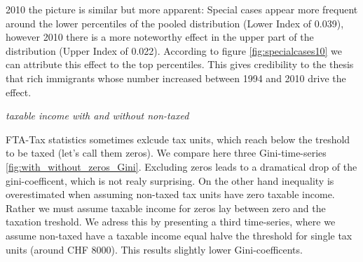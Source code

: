 \documentclass[twoside]{article}\usepackage[]{graphicx}\usepackage[]{color}
\begin{document}
\begin{multicols}{2}
\begin{table}[H]
\end{table}


2010 the picture is similar but more apparent: Special cases appear more frequent around the lower percentiles of the pooled distribution (Lower Index of 0.039), however 2010 there is a more noteworthy effect in the upper part of the distribution (Upper Index of 0.022). According to figure \ref{fig:specialcases10} we can attribute this effect to the top percentiles. This gives credibility to the thesis that rich immigrants whose number increased between 1994 and 2010 drive the effect.





\emph{taxable income with and without non-taxed}

FTA-Tax statistics sometimes exlcude tax units, which reach below the treshold to be taxed (let's call them zeros). We compare here three Gini-time-series \ref{fig:with_without_zeros_Gini}. Excluding zeros leads to a dramatical drop of the gini-coefficent, which is not realy surprising. On the other hand inequality is overestimated when assuming non-taxed tax units have zero taxable income. Rather we must assume taxable income for zeros lay between zero and the taxation treshold. We adress this by presenting a third time-series, where we assume non-taxed have a taxable income equal halve the threshold for single tax units (around CHF 8000). This results slightly lower Gini-coefficents.


\end{multicols}
\end{document}
